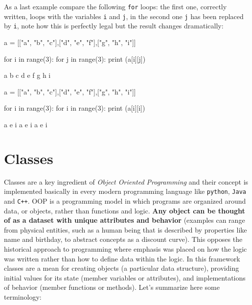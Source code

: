 As a last example compare the following \texttt{for} loops: the first one, correctly written, loops with the variables \texttt{i} and \texttt{j}, in the second one \texttt{j} has been replaced by \texttt{i}, note how this is perfectly legal but the result changes dramatically:

\begin{ipythonnon}
a = [["a", "b", "c"],["d", "e", "f"],["g", "h", "i"]]

for i in range(3):
    for j in range(3):
        print (a[i][j])
\end{ipythonnon}
\begin{ioutput} 	  
a
b
c
d
e
f
g
h
i
\end{ioutput}

\begin{ipythonnon}
a = [["a", "b", "c"],["d", "e", "f"],["g", "h", "i"]]

for i in range(3):
    for i in range(3):
        print (a[i][i])
\end{ipythonnon}
\begin{ioutput} 	  
a
e
i
a
e
i
a
e
i
\end{ioutput}

\section{Classes}
\label{sec:class}

Classes are a key ingredient of \emph{Object Oriented Programming} and their concept is implemented basically in every modern programming language like \texttt{python}, \texttt{Java} and \texttt{C++}. OOP is a programming model in which programs are organized around data, or objects, rather than functions and logic.
\textbf{Any object can be thought of as a dataset with unique attributes and behavior} (examples can range from physical entities, such as a human being that is described by properties like name and birthday, to abstract concepts as a discount curve). This opposes the historical 
approach to programming where emphasis was placed on how the logic was written rather than how to define data within the logic. In this framework classes are a mean for creating objects (a particular data structure), providing initial values for its state (member variables or attributes), and implementations of behavior (member functions or methods).
Let's summarize here some terminology:

